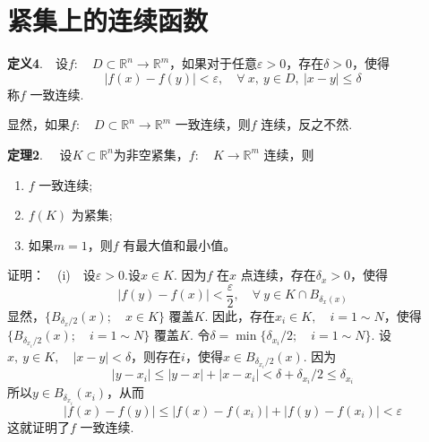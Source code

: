 \documentclass{article}
\begin{document}
\newpage

\section{紧集上的连续函数}
\textbf{定义4}.\ \ 设\(f:\quad D \subset \mathbb{R}^n \to \mathbb{R}^{m}\)，如果对于任意\(\varepsilon > 0\)，存在\(\delta > 0\)，使得
\begin{equation*}
    | f(x) - f(y)| < \varepsilon,\quad \forall\ x,\ y \in D,\ | x - y | \le \delta
\end{equation*}
称\(f\) 一致连续.

\vspace{10pt}

显然，如果\(f:\quad D \subset \mathbb{R}^n \to \mathbb{R}^{m}\) 一致连续，则\(f\) 连续，反之不然.

\vspace{20pt}

\textbf{定理2}. \ \ 设\(K \subset \mathbb{R}^n\)为非空紧集，\(f:\quad K \to \mathbb{R}^{m}\) 连续，则
\begin{enumerate}
    \item \(f\) 一致连续;
    \item \(f(K)\) 为紧集;
    \item 如果\(m = 1\)，则\(f\) 有最大值和最小值。
\end{enumerate}

\newpage

证明：\ \ (i)\ \ 设\(\varepsilon > 0\).设\(x \in K\). 因为\(f\) 在\(x\) 点连续，存在\(\delta _{x} > 0\)，使得
\begin{equation*}
    | f(y) - f(x)  |< \frac{\varepsilon}{2},\quad \forall\ y \in K \cap B_{\delta _{x}(x)}
\end{equation*}
显然，\(\{B_{\delta_{x}/{2}}(x);\quad x \in K\} \) 覆盖\(K\). 因此，存在\(x_i \in K,\quad i = 1 \sim N\)，使得\(\{B_{\delta_{x_{i}}/{2}}(x);\quad i = 1 \sim N\} \) 覆盖\(K\). 令\(\delta = \min \{\delta_{x_{i}}/{2};\quad i = 1 \sim N\} \). 设\(x,\ y \in K,\quad | x - y |< \delta  \)，则存在\(i\)，使得\(x \in B_{\delta_{x_{i}}/{2}}(x)\). 因为
\begin{equation*}
    | y - x_i | \le | y - x |+ | x - x_i |< \delta + \delta_{x_{i}}/{2} \le \delta_{x_{i}}
\end{equation*}
所以\(y \in B_{\delta_{x_{i}}}(x_i)\)，从而
\begin{equation*}
    | f(x) - f(y) | \le | f(x) - f(x_i)   |+ | f(y) - f(x_i)  |< \varepsilon
\end{equation*}
这就证明了\(f\) 一致连续.
\end{document}

